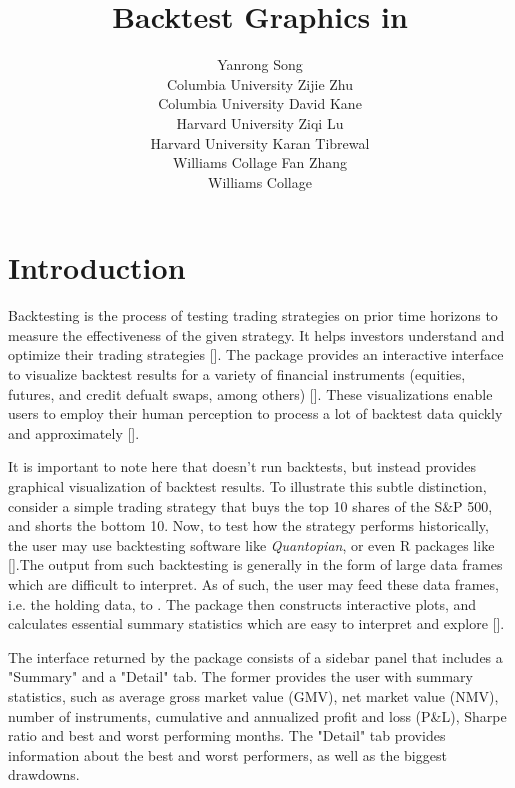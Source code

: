 \documentclass[article]{jss}
\author{Yanrong Song\\Columbia University
   \And Zijie Zhu\\Columbia University
   \And David Kane\\Harvard University
   \AND Ziqi Lu\\Harvard University
   \And Karan Tibrewal\\Williams Collage
   \And Fan Zhang\\Williams Collage}
\title{Backtest Graphics in \proglang{R}}
\begin{document}


\section[Introduction]{Introduction} \label{sec:intro}


Backtesting is the process of testing trading strategies on prior time horizons to measure the effectiveness of the given strategy. It helps investors understand and optimize their trading strategies [\cite{backtest}]. The  package provides an interactive  interface to visualize backtest results for a variety of financial instruments (equities, futures, and credit defualt swaps, among others) [\cite{shiny}]. These visualizations enable users to employ their human perception to process a lot of backtest data quickly and approximately [\cite{bostock}].

\noindent
It is important to note here that  doesn't run backtests, but instead provides graphical visualization of backtest results. To illustrate this subtle distinction, consider a simple trading strategy that buys the top 10 shares of the S\&P 500, and shorts the bottom 10. Now, to test how the strategy performs historically, the user may use backtesting software like \emph{Quantopian}, or even  R packages like  [\cite{backtest}].The output from such backtesting is generally in the form of large data frames which are difficult to interpret. As of such, the user may feed these data frames, i.e. the holding data, to . The package then constructs interactive  plots, and calculates essential summary statistics which are easy to interpret and explore [\cite{dygraphs}].

\noindent
The  interface returned by the package consists of a sidebar panel that includes a "Summary" and a "Detail" tab. The former provides the user with summary statistics, such as average gross market value (GMV), net market value (NMV), number of instruments, cumulative and annualized profit and loss (P\&L), Sharpe ratio and best and worst performing months. The "Detail" tab provides information about the best and worst performers, as well as the biggest drawdowns. 
\end{document}
